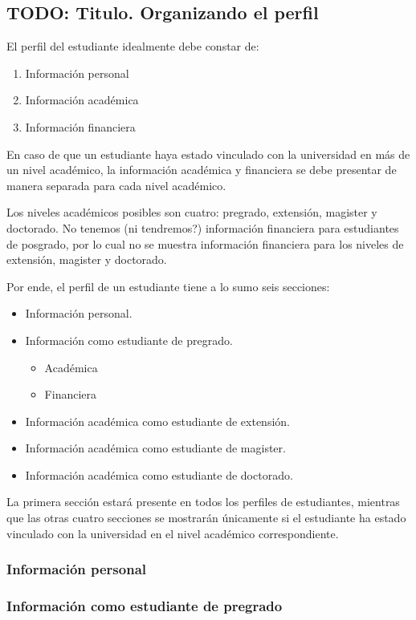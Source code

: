 \subsection{TODO: Titulo. Organizando el perfil}

El perfil del estudiante idealmente debe constar de:
\begin{enumerate}
	\item Información personal
	\item Información académica
	\item Información financiera
\end{enumerate}
En caso de que un estudiante haya estado vinculado con la universidad en más de un nivel académico, la información académica y financiera se debe presentar de manera separada para cada nivel académico.

Los niveles académicos posibles son cuatro: pregrado, extensión, magister y doctorado. No tenemos (ni tendremos?) información financiera para estudiantes de posgrado, por lo cual no se muestra información financiera para los niveles de extensión, magister y doctorado.

Por ende, el perfil de un estudiante tiene a lo sumo seis secciones:
\begin{itemize}
	\item Información personal.
	\item Información como estudiante de pregrado.
	      \begin{itemize}
		      \item Académica
		      \item Financiera
	      \end{itemize}
	\item Información académica como estudiante de extensión.
	\item Información académica como estudiante de magister.
	\item Información académica como estudiante de doctorado.
\end{itemize}
La primera sección estará presente en todos los perfiles de estudiantes, mientras que las otras cuatro secciones se mostrarán únicamente si el estudiante ha estado vinculado con la universidad en el nivel académico correspondiente.

\subsubsection{Información personal}


\subsubsection{Información como estudiante de pregrado}

